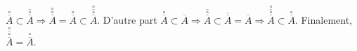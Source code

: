 {\begin{enumerate}
{$\overset{\circ}{\overline{A}}\subset\overline{\overset{\circ}{\overline{A}}}\Rightarrow\overset{\circ}{\overset{\circ}{\overline{A}}}=\overset{\circ}{\overline{A}}\subset\overset{\circ}{\overline{\overset{\circ}{\overline{A}}}}$. D'autre part  $\overset{\circ}{\overline{A}}\subset\overline{A}\Rightarrow\overline{\overset{\circ}{\overline{A}}}\subset\overline{\overline{A}}=\overline{A}\Rightarrow\overset{\circ}{\overline{\overset{\circ}{\overline{A}}}}\subset\overset{\circ}{\overline{A}}$. Finalement, $\overset{\circ}{\overline{\overset{\circ}{\overline{A}}}}=\overset{\circ}{\overline{A}}$.}
\end{enumerate}
}
